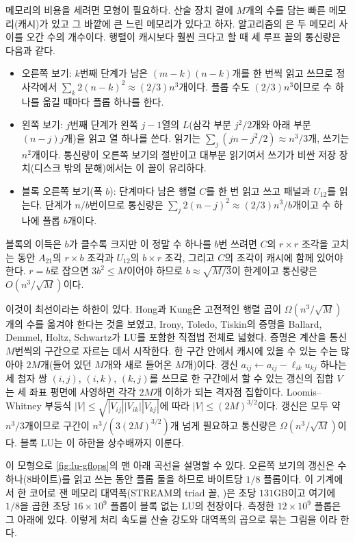 메모리의 비용을 세려면 모형이 필요하다. 산술 장치 곁에 $M$개의 수를 담는 빠른 메모리(캐시)가 있고 그 바깥에 큰 느린 메모리가 있다고 하자. 알고리즘의 은 두 메모리 사이를 오간 수의 개수이다. 행렬이 캐시보다 훨씬 크다고 할 때 세 루프 꼴의 통신량은 다음과 같다.
\begin{itemize}
\item 오른쪽 보기: $k$번째 단계가 남은 $(m-k)(n-k)$개를 한 번씩 읽고 쓰므로 정사각에서 $\sum_k2(n-k)^2\approx(2/3)n^3$개이다. 플롭 수도 $(2/3)n^3$이므로 수 하나를 옮길 때마다 플롭 하나를 한다.
\item 왼쪽 보기: $j$번째 단계가 왼쪽 $j-1$열의 $L$(삼각 부분 $j^2/2$개와 아래 부분 $(n-j)j$개)을 읽고 열 하나를 쓴다. 읽기는 $\sum_j(jn-j^2/2)\approx n^3/3$개, 쓰기는 $n^2$개이다. 통신량이 오른쪽 보기의 절반이고 대부분 읽기여서 쓰기가 비싼 저장 장치(디스크 밖의 분해)에서는 이 꼴이 유리하다.
\item 블록 오른쪽 보기(폭 $b$): 단계마다 남은 행렬 $C$를 한 번 읽고 쓰고 패널과 $U_{12}$를 읽는다. 단계가 $n/b$번이므로 통신량은 $\sum_j2(n-j)^2\approx(2/3)n^3/b$개이고 수 하나에 플롭 $b$개이다.
\end{itemize}
블록의 이득은 $b$가 클수록 크지만 이 정말 수 하나를 $b$번 쓰려면 $C$의 $r\times r$ 조각을 고치는 동안 $A_{21}$의 $r\times b$ 조각과 $U_{12}$의 $b\times r$ 조각, 그리고 $C$의 조각이 캐시에 함께 있어야 한다. $r=b$로 잡으면 $3b^2\le M$이어야 하므로 $b\approx\sqrt{M/3}$이 한계이고 통신량은 $O(n^3/\sqrt M)$이다.

이것이 최선이라는 하한이 있다. Hong과 Kung은 고전적인 행렬 곱이 $\Omega(n^3/\sqrt M)$개의 수를 옮겨야 한다는 것을 보였고\cite{hong1981io}, Irony, Toledo, Tiskin의 증명\cite{irony2004communication}을 Ballard, Demmel, Holtz, Schwartz가 LU를 포함한 직접법 전체로 넓혔다\cite{ballard2011minimizing}. 증명은 계산을 통신 $M$번씩의 구간으로 자르는 데서 시작한다. 한 구간 안에서 캐시에 있을 수 있는 수는 많아야 $2M$개(들어 있던 $M$개와 새로 들어온 $M$개)이다. 갱신 $a_{ij}\gets a_{ij}-\ell_{ik}u_{kj}$ 하나는 세 첨자 쌍 $(i,j)$, $(i,k)$, $(k,j)$를 쓰므로 한 구간에서 할 수 있는 갱신의 집합 $V$는 세 좌표 평면에 사영하면 각각 $2M$개 이하가 되는 격자점 집합이다. Loomis--Whitney 부등식 $|V|\le\sqrt{|V_{ij}||V_{ik}||V_{kj}|}$에 따라 $|V|\le(2M)^{3/2}$이다. 갱신은 모두 약 $n^3/3$개이므로 구간이 $n^3/(3(2M)^{3/2})$개 넘게 필요하고 통신량은 $\Omega(n^3/\sqrt M)$이다. 블록 LU는 이 하한을 상수배까지 이룬다.

이 모형으로 \cref{fig:lu-gflops}의 맨 아래 곡선을 설명할 수 있다. 오른쪽 보기의 갱신은 수 하나(8바이트)를 읽고 쓰는 동안 플롭 둘을 하므로 바이트당 $1/8$ 플롭이다. 이 기계에서 한 코어로 잰 메모리 대역폭(STREAM의 triad 꼴, )은 초당 $131$GB이고 여기에 $1/8$을 곱한 초당 $16\times10^9$ 플롭이 블록 없는 LU의 천장이다. 측정한 $12\times10^9$ 플롭은 그 아래에 있다. 이렇게 처리 속도를 산술 강도와 대역폭의 곱으로 묶는 그림을 이라 한다.

